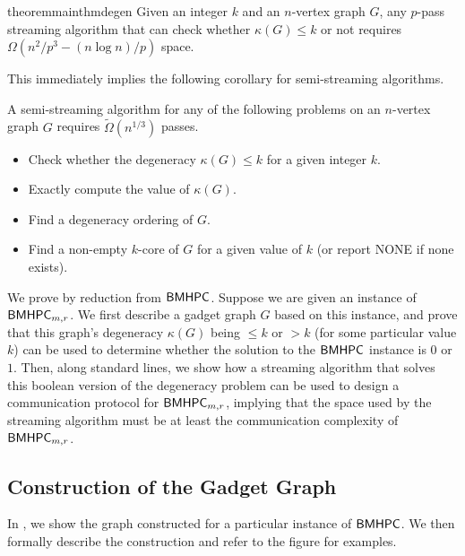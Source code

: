 \documentclass[11pt,letterpaper]{article}
\renewcommand{\leq}{\leqslant}
\theoremstyle{definition}
\newcommand{\bmhpc}{\ensuremath{\textnormal{\textsf{BMHPC}}}\xspace}
\begin{document}
\begin{restatable}{theorem}{mainthmdegen}
\label{thm:degen-lb}
Given an integer $k$ and an $n$-vertex graph $G$, any $p$-pass streaming algorithm that can check whether $\kappa(G)\leq k$ or not requires $\Omega(n^2/p^3- (n\log n)/p)$ space.   \end{restatable}


This immediately implies the following corollary for semi-streaming algorithms.

\begin{corollary}
A semi-streaming algorithm for any of the following problems on an $n$-vertex graph $G$ requires $\tilde{\Omega}(n^{1/3})$ passes.
\begin{itemize}
    \item Check whether the degeneracy $\kappa(G)\leq k$ for a given integer $k$.
    \item Exactly compute the value of  $\kappa(G)$.
    \item Find a degeneracy ordering of $G$.
    \item Find a non-empty $k$-core of $G$ for a given value of $k$ (or report NONE if none exists).
\end{itemize}
 \end{corollary}


We prove  by reduction from \bmhpc. Suppose we are given an instance of $\bmhpc_{m,r}$. We first describe a gadget graph $G$ based on this instance, and prove that this graph's degeneracy $\kappa(G)$ being $\leq k$ or $>k$ (for some particular value $k$) can be used to determine whether the solution to the \bmhpc instance is $0$ or $1$. Then, along standard lines, we show how a streaming algorithm that solves this boolean version of the  degeneracy problem can be used to design a communication protocol for $\bmhpc_{m,r}$, implying that the space used by the streaming algorithm must be at least the communication complexity of $\bmhpc_{m,r}$. 

\subsection{Construction of the Gadget Graph}\label{sec:redn-graph}
 In , we show the graph constructed for a particular instance of \bmhpc. We then formally describe the construction and refer to the figure for examples. 
 
\end{document}
